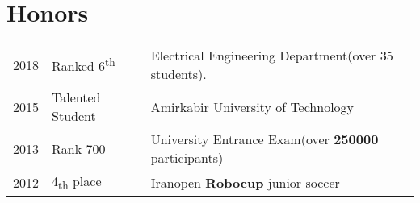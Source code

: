 \documentclass[]{plushcv}
\begin{document}
\begin{minipage}[t]{0.70\textwidth}

\section{Honors} 
\begin{tabular}{rll}
2018	     & Ranked 6\textsuperscript{th}  & Electrical Engineering Department(over 35 students).\\
2015	     & Talented Student & Amirkabir University of Technology \\
2013        &  Rank 700  & University Entrance Exam(over \textbf{250000} participants) \\
2012        & 4\textsubscript{th} place & Iranopen \textbf{Robocup} junior soccer
\end{tabular}
%
%

\end{minipage} 
\hfill
\end{document}
